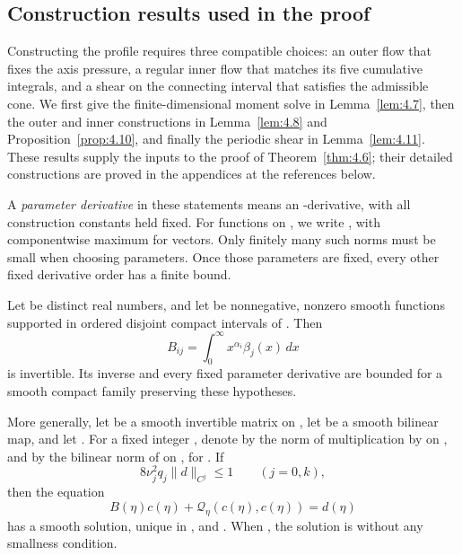 \subsection{Construction results used in the proof}\label{sec:4.5}

Constructing the profile requires three compatible choices: an outer flow that fixes the axis pressure, a regular inner flow that matches its five cumulative integrals, and a shear on the connecting interval that satisfies the admissible cone. We first give the finite-dimensional moment solve in Lemma~\ref{lem:4.7}, then the outer and inner constructions in Lemma~\ref{lem:4.8} and Proposition~\ref{prop:4.10}, and finally the periodic shear in Lemma~\ref{lem:4.11}. These results supply the inputs to the proof of Theorem~\ref{thm:4.6}; their detailed constructions are proved in the appendices at the references below.

A \emph{parameter derivative} in these statements means an -derivative, with all construction constants held fixed. For functions on , we write , with componentwise maximum for vectors. Only finitely many such norms must be small when choosing parameters. Once those parameters are fixed, every other fixed derivative order has a finite bound.

\begin{lemma}\label{lem:4.7}
Let  be distinct real numbers, and let  be nonnegative, nonzero smooth functions supported in ordered disjoint compact intervals of . Then
\[
  B_{ij}=\int_0^\infty x^{\alpha_i}\beta_j(x)\,dx
\]
is invertible. Its inverse and every fixed parameter derivative are bounded for a smooth compact family preserving these hypotheses.

More generally, let  be a smooth invertible matrix on , let  be a smooth bilinear map, and let . For a fixed integer , denote by  the norm of multiplication by  on , and by  the bilinear norm of  on , for . If
\[
  8\nu_j^2q_j\|d\|_{C^j}\leq1\qquad(j=0,k),
\]
then the equation
\[
  B(\eta)c(\eta)+\mathcal Q_\eta(c(\eta),c(\eta))=d(\eta)
\]
has a smooth solution, unique in , and . When , the solution is  without any smallness condition.
\end{lemma}


